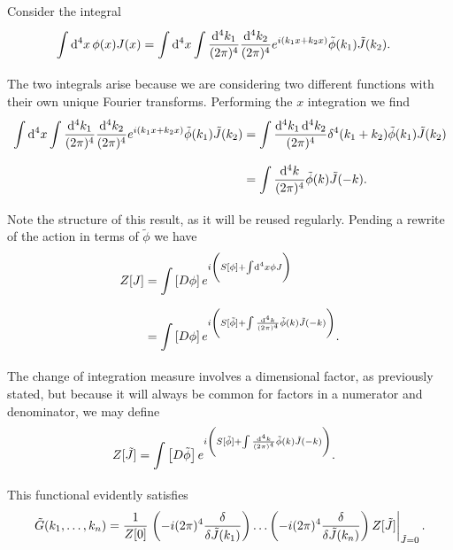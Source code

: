 Consider the integral
\begin{align*}
	\int\limits_{}^{}\dd[4]{x}\phi(x)J(x) &= \int\limits_{}^{}\dd[4]{x}\int\limits_{}^{}\frac{\dd[4]{k_{1}}}{(2\pi)^{4}}\frac{\dd[4]{k_{2}}}{(2\pi)^{4}}e^{i(k_{1}x + k_{2}x)}\tilde{\phi}(k_{1})\tilde{J}(k_{2}).
\end{align*}
The two integrals arise because we are considering two different functions with their own unique Fourier transforms. Performing the $x$ integration we find
\begin{align*}
	\int\limits_{}^{}\dd[4]{x}\int\limits_{}^{}\frac{\dd[4]{k_{1}}}{(2\pi)^{4}}\frac{\dd[4]{k_{2}}}{(2\pi)^{4}}e^{i(k_{1}x + k_{2}x)}\tilde{\phi}(k_{1})\tilde{J}(k_{2}) &= \int\limits_{}^{}\frac{\dd[4]{k_{1}}\dd[4]{k_{2}}}{(2\pi)^{4}}\delta^{4}(k_{1} + k_{2})\tilde{\phi}(k_{1})\tilde{J}(k_{2}) \\
	&= \int\limits_{}^{}\frac{\dd[4]{k}}{(2\pi)^{4}}\tilde{\phi}(k)\tilde{J}(-k).
\end{align*}
Note the structure of this result, as it will be reused regularly. Pending a rewrite of the action in terms of $\tilde{\phi}$ we have
\begin{align*}
	Z[J] &= \int\limits_{}\left[D\phi\right]e^{i\left(S[\phi] + \int\limits_{}^{}\dd[4]{x}\phi J\right)} \\
	     &= \int\limits_{}\left[D\phi\right]e^{i\left(S[\tilde{\phi}] + \int\limits_{}^{}\frac{\dd[4]{k}}{(2\pi)^{4}}\tilde{\phi}(k)\tilde{J}(-k)\right)}.
\end{align*}
The change of integration measure involves a dimensional factor, as previously stated, but because it will always be common for factors in a numerator and denominator, we may define
\begin{align*}
	Z[\tilde{J}] &= \int\limits_{}\left[D\tilde{\phi}\right]e^{i\left(S[\tilde{\phi}] + \int\limits_{}^{}\frac{\dd[4]{k}}{(2\pi)^{4}}\tilde{\phi}(k)\tilde{J}(-k)\right)}.
\end{align*}
This functional evidently satisfies
\begin{align*}
	\tilde{G}(k_{1}, \dots, k_{n}) = \frac{1}{Z[0]}\eval{\left(-i(2\pi)^{4}\fdv{\tilde{J}(k_{1})}\right)\dots\left(-i(2\pi)^{4}\fdv{\tilde{J}(k_{n})}\right)Z[\tilde{J}]}_{\tilde{J} = 0}.
\end{align*}

